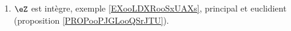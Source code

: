 
\begin{enumerate}
    \item
        \( \eZ\) est intègre, exemple \ref{EXooLDXRooSxUAXs}, principal et euclidient (proposition \ref{PROPooPJGLooQSrJTU}).
\end{enumerate}

